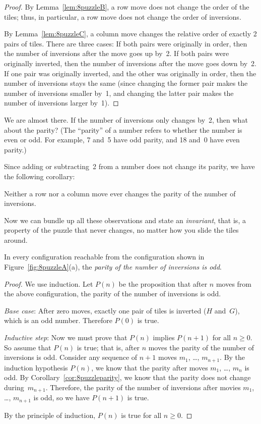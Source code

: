 \begin{proof}
By Lemma~\ref{lem:8puzzleB}, a row move does not change the order of
the tiles; thus, in particular, a row move does not change the order
of inversions.

By Lemma~\ref{lem:8puzzleC}, a column move changes the relative order
of exactly 2 pairs of tiles.  There are three cases: If both pairs
were originally in order, then the number of inversions after the move
goes up by~2.  If both pairs were originally inverted, then the number
of inversions after the move goes down by~2.  If one pair was
originally inverted, and the other was originally in order, then the
number of inversions stays the same (since changing the former pair
makes the number of inversions smaller by~1, and changing the latter
pair makes the number of inversions larger by~1).
\end{proof}

We are almost there.  If the number of inversions only changes by~2,
then what about the parity?  (The ``parity'' of a number refers to
whether the number is even or odd.  For example, 7 and~5 have odd
parity, and 18 and~0 have even parity.)

Since adding or subtracting~2 from a number does not change its
parity, we have the following corollary:
\begin{corollary}\label{cor:8puzzleparity}
Neither a row nor a column move ever changes the parity of the number
of inversions.
\end{corollary}

Now we can bundle up all these observations and state an
\emph{invariant}, that is, a property of the puzzle that never
changes, no matter how you slide the tiles around.

\begin{lemma}\label{lem:8puzzleD}
In every configuration reachable from the configuration shown in
Figure~\ref{fig:8puzzleA}(a), the \emph{parity of the number of inversions
  is odd}.
\end{lemma}

\begin{proof}
We use induction.  Let $P(n)$ be the proposition that after $n$ moves
from the above configuration, the parity of the number of inversions
is odd.

\emph{Base case}: After zero moves, exactly one pair of tiles is
inverted ($H$ and~$G$), which is an odd number.  Therefore $P(0)$ is
true.

\emph{Inductive step}:
Now we must prove that $P(n)$ implies $P(n+1)$ for all $n \ge 0$.  So
assume that $P(n)$ is true; that is, after $n$ moves the parity of the
number of inversions is odd.  Consider any sequence of $n+1$ moves
$m_1$, \dots, $m_{n+1}$.  By the induction hypothesis $P(n)$, we know
that the parity after moves $m_1$, \dots, $m_{n}$ is odd.  By
Corollary~\ref{cor:8puzzleparity}, we know that the parity does not
change during~$m_{n+1}$.  Therefore, the parity of the number of
inversions after movies $m_1$, \dots, $m_{n+1}$ is odd, so we have $P(n
+ 1)$ is true.

By the principle of induction, $P(n)$ is true for all $n \ge 0$.
\end{proof}

